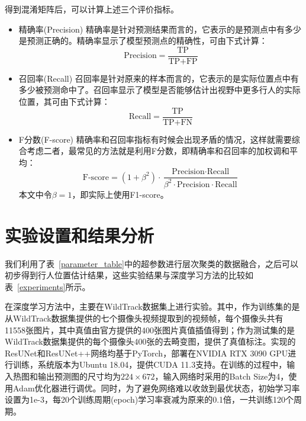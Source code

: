 得到混淆矩阵后，可以计算上述三个评价指标。
\begin{itemize}
    \item 精确率(Precision) 精确率是针对预测结果而言的，它表示的是预测点中有多少是预测正确的。精确率显示了模型预测点的精确性，可由下式计算：
        \begin{equation*}
            \text{Precision}=\frac{\text{TP}}{\text{TP}+\text{FP}}
        \end{equation*}
    \item 召回率(Recall) 召回率是针对原来的样本而言的，它表示的是实际位置点中有多少被预测命中了。召回率显示了模型是否能够估计出视野中更多行人的实际位置，其可由下式计算：
    \begin{equation*}
        \text{Recall}=\frac{\text{TP}}{\text{TP}+\text{FN}}
    \end{equation*}
    \item F分数(F-score) 精确率和召回率指标有时候会出现矛盾的情况，这样就需要综合考虑二者，最常见的方法就是利用F分数，即精确率和召回率的加权调和平均：
    \begin{equation*}
        \text{F-score}=(1+\beta^2)\cdot \frac{\text{Precision} \cdot \text{Recall}}{\beta^2 \cdot \text{Precision} \cdot \text{Recall}}
    \end{equation*}
    本文中令$\beta=1$，即实际上使用F1-score。
\end{itemize}

\section{实验设置和结果分析}

我们利用了表~\ref{parameter_table}中的超参数进行层次聚类的数据融合，之后可以初步得到行人位置估计结果，这些实验结果与深度学习方法的比较如表~\ref{experiments}所示。

在深度学习方法中，主要在WildTrack数据集上进行实验。其中，作为训练集的是从WildTrack数据集提供的七个摄像头视频提取到的视频帧，每个摄像头共有11558张图片，其中真值由官方提供的400张图片真值插值得到；作为测试集的是WildTrack数据集提供的每个摄像头400张的去畸变图，提供了真值标注。实现的ResUNet和ResUNet++网络均基于PyTorch，部署在NVIDIA RTX 3090 GPU进行训练，系统版本为Ubuntu 18.04，提供CUDA 11.3支持。在训练的过程中，输入热图和输出预测图的尺寸均为$224\times 672$，输入网络时采用的Batch Size为4，使用Adam优化器进行调优。同时，为了避免网络难以收敛到最优状态，初始学习率设置为1e-3，每20个训练周期(epoch)学习率衰减为原来的0.1倍，一共训练120个周期。

